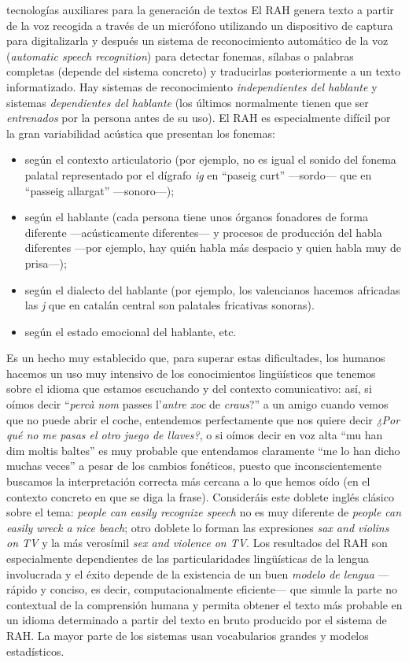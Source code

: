 {\begin{persabermes}{tecnologías auxiliares para la generación de textos}
El RAH genera texto a partir de la voz recogida a través de un micrófono utilizando un dispositivo de captura para digitalizarla y después un sistema de reconocimiento automático de la voz (\emph{automatic speech recognition}) para detectar fonemas, sílabas o palabras completas (depende del sistema concreto) y traducirlas posteriormente a un texto informatizado. Hay sistemas de reconocimiento {\em independientes del hablante} y sistemas \emph{dependientes del hablante} (los últimos normalmente tienen que ser \emph{entrenados} por la persona antes de su uso). El RAH es especialmente difícil por la gran variabilidad acústica que presentan los fonemas: \begin{itemize} \item según el contexto articulatorio (por ejemplo, no es igual el sonido del fonema palatal representado por el dígrafo \emph{ig} en ``paseig curt'' ---sordo--- que en ``passeig allargat'' ---sonoro---); \item según el hablante (cada persona tiene unos órganos fonadores de forma diferente ---acústicamente diferentes--- y procesos de producción del habla diferentes ---por ejemplo, hay quién habla más despacio y quien habla muy de prisa---); \item según el dialecto del hablante (por ejemplo, los valencianos hacemos africadas las \emph{j} que en catalán central son palatales fricativas sonoras). \item según el estado emocional del hablante, etc. \end{itemize} Es un hecho muy establecido que, para superar estas dificultades, los humanos hacemos un uso muy intensivo de los conocimientos lingüísticos que tenemos sobre el idioma que estamos escuchando y del contexto comunicativo: así, si oímos decir ``\emph{percà nom} passes l'\emph{antre xoc} de \emph{craus}?'' a un amigo cuando vemos que no puede abrir el coche, entendemos perfectamente que nos quiere decir \emph{¿Por qué no me pasas el otro juego de llaves?}, o si oímos decir en voz alta ``mu han dim moltis baltes'' es muy probable que entendamos claramente ``me lo han dicho muchas veces'' a pesar de los cambios fonéticos, puesto que inconscientemente buscamos la interpretación correcta más cercana a lo que hemos oído (en el contexto concreto en que se diga la frase). Consideráis este doblete inglés clásico sobre el tema: \emph{people can easily recognize speech} no es muy diferente de {\em people can easily wreck a nice beach}; otro doblete lo forman las expresiones \emph{sax and violins on TV} y la más verosímil \emph{sex and violence on TV}. Los resultados del RAH son especialmente dependientes de las particularidades lingüísticas de la lengua involucrada y el éxito depende de la existencia de un buen \emph{modelo de lengua} ---rápido y conciso, es decir, computacionalmente eficiente--- que simule la parte no contextual de la comprensión humana y permita obtener el texto más probable en un idioma determinado a partir del texto en bruto producido por el sistema de RAH. La mayor parte de los sistemas usan vocabularios grandes y modelos estadísticos. 


\end{persabermes}}
